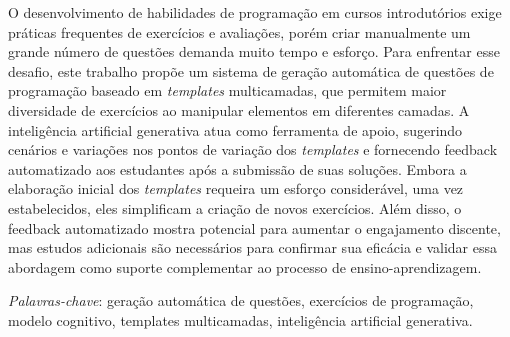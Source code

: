 \begin{resumo}
O desenvolvimento de habilidades de programação em cursos introdutórios exige práticas frequentes de exercícios e avaliações, porém criar manualmente um grande número de questões demanda muito tempo e esforço. Para enfrentar esse desafio, este trabalho propõe um sistema de geração automática de questões de programação baseado em \textit{templates} multicamadas, que permitem maior diversidade de exercícios ao manipular elementos em diferentes camadas. A inteligência artificial generativa atua como ferramenta de apoio, sugerindo cenários e variações nos pontos de variação  dos \textit{templates} e fornecendo feedback automatizado aos estudantes após a submissão de suas soluções. Embora a elaboração inicial dos \textit{templates} requeira um esforço considerável, uma vez estabelecidos, eles simplificam a criação de novos exercícios. Além disso, o feedback automatizado mostra potencial para aumentar o engajamento discente, mas estudos adicionais são necessários para confirmar sua eficácia e validar essa abordagem como suporte complementar ao processo de ensino-aprendizagem. 
 
  \bigbreak

  \noindent
  \textit{Palavras-chave}: geração automática de questões, exercícios de programação, modelo cognitivo, templates multicamadas, inteligência artificial generativa.
\end{resumo}